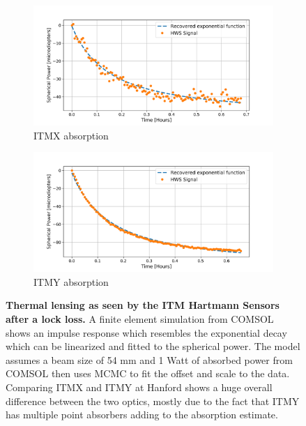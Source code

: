 \begin{figure}[ht]
	\centering
	\begin{subfigure}[a]{0.7\textwidth}
		\centering
		\includegraphics[width=\textwidth]{../Figures/MCMC_ITMX_ABS_FIT.png}
		\caption{ITMX absorption}
		\label{fig:itmx_abs}
	\end{subfigure}
	\hfill
	\begin{subfigure}[b]{0.7\textwidth}
		\centering
		\includegraphics[width=\textwidth]{../Figures/MCMC_ITMY_ABS_FIT.png}
		\caption{ITMY absorption}
		\label{fig:itmy_abs}
	\end{subfigure}
	\caption[Thermal lensing as seen by the ITM Hartmann Sensors after a lock loss.]  
	{\textbf{Thermal lensing as seen by the ITM Hartmann Sensors after a lock loss.} A finite element simulation from COMSOL shows an impulse response which resembles the exponential decay which can be linearized and fitted to the spherical power. The model assumes a beam size of 54 mm and 1 Watt of absorbed power from COMSOL then uses MCMC to fit the offset and scale to the data. Comparing ITMX and ITMY at Hanford shows a huge overall difference between the two optics, mostly due to the fact that ITMY has multiple point absorbers adding to the absorption estimate.}
	\label{fig:hws_abs}
\end{figure}

